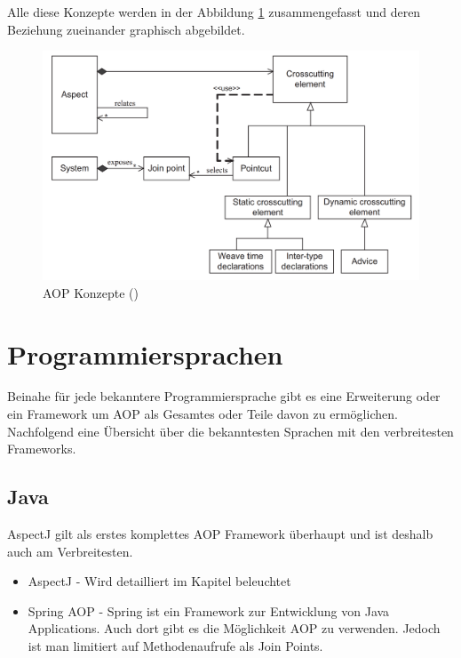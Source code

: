 Alle diese Konzepte werden in der Abbildung \ref{fig:concepts} zusammengefasst und deren Beziehung zueinander graphisch abgebildet.

\begin{figure}[H]
	\centering
		\includegraphics[scale=0.5]{bilder/concepts.png}
	\caption{AOP Konzepte (\cite[p~60]{laddad:aspectj})}
	\label{fig:concepts}
\end{figure}
\newpage

\section{Programmiersprachen}

Beinahe für jede bekanntere Programmiersprache gibt es eine Erweiterung oder ein Framework um AOP als Gesamtes oder Teile davon zu ermöglichen. Nachfolgend eine Übersicht über die bekanntesten Sprachen mit den verbreitesten Frameworks.

\subsection{Java}

AspectJ gilt als erstes komplettes AOP Framework überhaupt und ist deshalb auch am Verbreitesten.

\begin{itemize}
\item AspectJ - Wird detailliert im Kapitel  beleuchtet
\item Spring AOP - Spring ist ein Framework zur Entwicklung von Java Applications. Auch dort gibt es die Möglichkeit AOP zu verwenden. Jedoch ist man limitiert auf Methodenaufrufe als Join Points.
\end{itemize}


